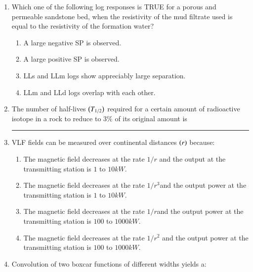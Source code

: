 \documentclass[journal,12pt,onecolumn]{IEEEtran}
\theoremstyle{remark}
\begin{document}
\begin{enumerate}
    \item Which one of the following log responses is TRUE for a porous and permeable sandstone bed, when the resistivity of the mud filtrate used is equal to the resistivity of the formation water?\hfill{}
                \begin{enumerate}
                        \item A large negative SP is observed.
                        \item A large positive SP is observed.
                        \item LLs and LLm logs show appreciably large separation.
                        \item LLm and LLd logs overlap with each other.
                \end{enumerate}
    
    \item The number of half-lives $\left(T_{1/2}\right)$  required for a certain amount of radioactive isotope in a rock to reduce to $3\%$ of its original amount is \rule{3cm}{0.15mm}\hfill{}
    
    \item VLF fields can be measured over continental distances $\left(r\right)$ because: \hfill{}
                \begin{enumerate}
                        \item The magnetic field decreases at the rate $1/r$ and the output at the transmitting station is $1$ to $10 kW$.
                        \item  The magnetic field decreases at the rate $1/{r^3}$and the output power at the transmitting station is $1$ to $10 kW$.
                        \item The magnetic field decreases at the rate $1/r$and the output power at the transmitting station is $100$ to $1000 kW$.
                        \item The magnetic field decreases at the rate $1/{r^2}$ and the output power at the transmitting station is $100$ to $1000 kW$.
                \end{enumerate}
    
    \item  Convolution of two boxcar functions of different widths yields a: \hfill{}
                \begin{enumerate}
                \end{enumerate}
    

\end{enumerate}
\end{document}
